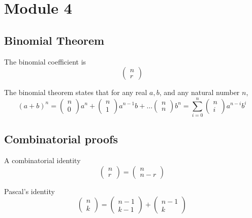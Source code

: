 \chapter{Module 4}

\section{Binomial Theorem}

The binomial coefficient is \[
  \begin{pmatrix} n \\ r \end{pmatrix} 
\] 

The binomial theorem states that for any real $a, b$, and any natural number $n$, 
\[
   (a + b)^n = \begin{pmatrix} n \\ 0 \end{pmatrix} a^n + \begin{pmatrix} n \\1  \end{pmatrix} a^{n-1}b + \hdots \begin{pmatrix} n \\n \end{pmatrix} b^n = \sum_{i = 0}^{n} \begin{pmatrix} n \\ i  \end{pmatrix} a^{n-i}b^i
\] 

\section{Combinatorial proofs}

A combinatorial identity
\[
  \begin{pmatrix} n \\ r \end{pmatrix}  = \begin{pmatrix} n \\ n - r \end{pmatrix} 
\] 

Pascal's identity
\[
  \begin{pmatrix}  n \\ k \end{pmatrix}  = \begin{pmatrix} n - 1 \\k - 1 \end{pmatrix}  + \begin{pmatrix} n - 1 \\k \end{pmatrix} 
\]  

